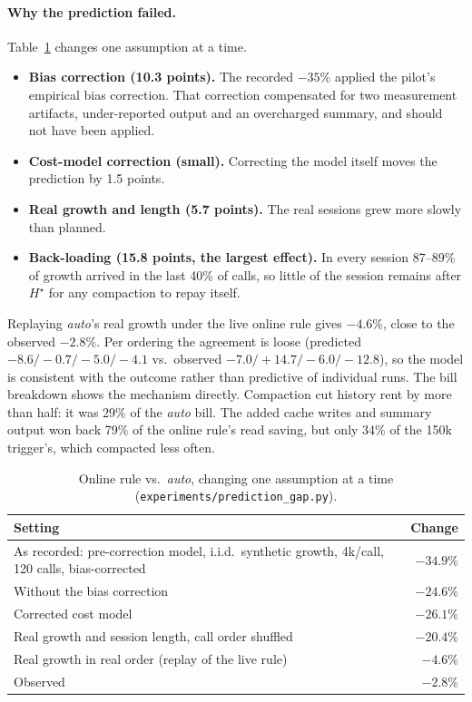 \documentclass[11pt]{article}
\begin{document}
\paragraph{Why the prediction failed.} Table~\ref{tab:gap} changes one assumption at a time.
\begin{itemize}
\item \textbf{Bias correction (10.3 points).} The recorded $-35\%$ applied the pilot's empirical bias correction. That correction compensated for two measurement artifacts, under-reported output and an overcharged summary, and should not have been applied.
\item \textbf{Cost-model correction (small).} Correcting the model itself moves the prediction by 1.5 points.
\item \textbf{Real growth and length (5.7 points).} The real sessions grew more slowly than planned.
\item \textbf{Back-loading (15.8 points, the largest effect).} In every session 87--89\% of growth arrived in the last 40\% of calls, so little of the session remains after $H^\star$ for any compaction to repay itself.
\end{itemize}
Replaying \emph{auto}'s real growth under the live online rule gives $-4.6\%$, close to the observed $-2.8\%$. Per ordering the agreement is loose (predicted $-8.6/-0.7/-5.0/-4.1$ vs.\ observed $-7.0/+14.7/-6.0/-12.8$), so the model is consistent with the outcome rather than predictive of individual runs. The bill breakdown shows the mechanism directly. Compaction cut history rent by more than half: it was 29\% of the \emph{auto} bill. The added cache writes and summary output won back 79\% of the online rule's read saving, but only 34\% of the 150k trigger's, which compacted less often.

\begin{table}[t]
\centering
\small
\caption{Online rule vs.\ \emph{auto}, changing one assumption at a time (\texttt{experiments/prediction\_gap.py}).}
\label{tab:gap}
\begin{tabular}{lr}
\toprule
Setting & Change\\
\midrule
As recorded: pre-correction model, i.i.d.\ synthetic growth, 4k/call, 120 calls, bias-corrected & $-34.9\%$\\
Without the bias correction & $-24.6\%$\\
Corrected cost model & $-26.1\%$\\
Real growth and session length, call order shuffled & $-20.4\%$\\
Real growth in real order (replay of the live rule) & $-4.6\%$\\
Observed & $-2.8\%$\\
\bottomrule
\end{tabular}
\end{table}
\end{document}
